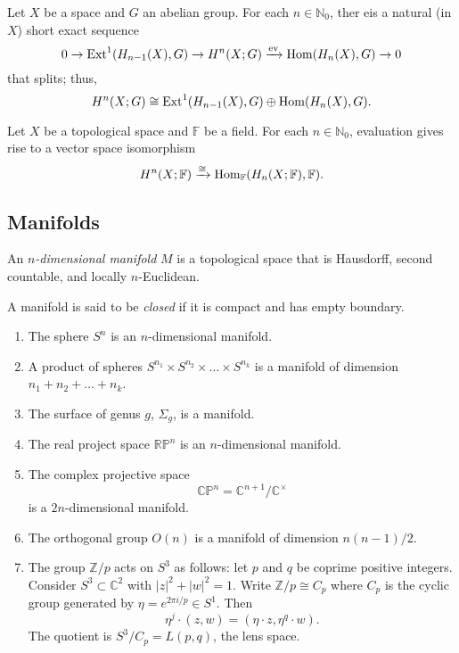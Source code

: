 \begin{theorem}
    Let $X$ be a space and $G$ an abelian group. For each $n \in \mathbb N_0$, ther eis a natural (in $X$) short exact sequence
    \[ 0 \to \operatorname{Ext}^1(H_{n-1}(X), G) \to H^n(X; G) \xrightarrow{\operatorname{ev}} \operatorname{Hom}(H_n(X), G) \to 0 \]
    that splits; thus,
    \[ H^n(X;G) \cong \operatorname{Ext}^1(H_{n-1}(X), G) \oplus \operatorname{Hom}(H_n(X), G). \]
\end{theorem}

\begin{theorem}
    Let $X$ be a topological space and $\mathbb F$ be a field. For each $n \in \mathbb N_0$, evaluation gives rise to a vector space isomorphism
    \[ H^n(X; \mathbb F) \xrightarrow{\cong} \operatorname{Hom}_{\mathbb F}(H_n(X; \mathbb F), \mathbb F). \]
\end{theorem}

\subsection{Manifolds}

\begin{definition}
    An \emph{$n$-dimensional manifold} $M$ is a topological space that is Hausdorff, second countable, and locally $n$-Euclidean.
\end{definition}

\begin{definition}
    A manifold is said to be \emph{closed} if it is compact and has empty boundary.
\end{definition}

\begin{example}
    \begin{enumerate}
        \item The sphere $S^n$ is an $n$-dimensional manifold.
        \item A product of spheres $S^{n_1} \times S^{n_2} \times \ldots \times S^{n_k}$ is a manifold of dimension $n_1 + n_2 + \ldots + n_k$.
        \item The surface of genus $g$, $\Sigma_g$, is a manifold.
        \item The real project space $\mathbb R \mathbb P^n$ is an $n$-dimensional manifold.
        \item The complex projective space
              \[ \mathbb C \mathbb P^n = \mathbb C^{n+1}/\mathbb C^\times \]
              is a $2n$-dimensional manifold.
        \item The orthogonal group $O(n)$ is a manifold of dimension $n(n-1)/2$.
        \item The group $\mathbb Z/p$ acts on $S^3$ as follows: let $p$ and $q$ be coprime positive integers. Consider $S^3 \subset \mathbb C^2$ with $\lvert z \rvert^2 + \lvert w \rvert^2 = 1$.  Write $\mathbb Z/p \cong C_p$ where $C_p$ is the cyclic group generated by $\eta = e^{2\pi i/p} \in S^1$. Then
              \[ \eta^j \cdot (z, w) = (\eta \cdot z, \eta^q \cdot w). \]
              The quotient is $S^3/C_p = L(p, q)$, the lens space.
    \end{enumerate}
\end{example}


